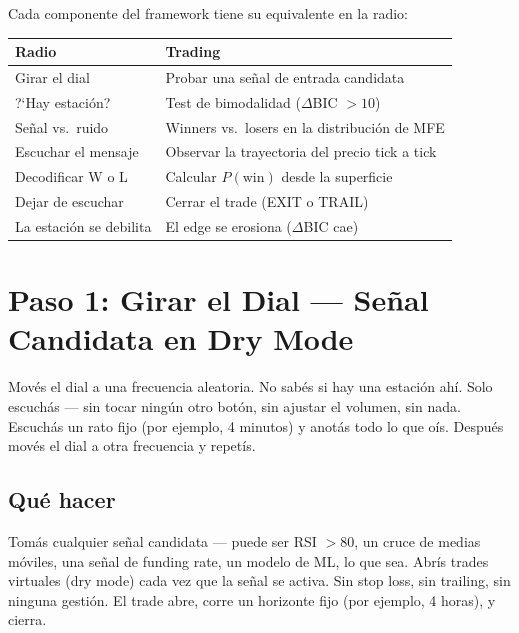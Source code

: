 \documentclass[11pt,a4paper]{article}
\newcommand{\pw}{P(\text{win})}
\begin{document}
Cada componente del framework tiene su equivalente en la radio:

\begin{table}[H]
\centering
\renewcommand{\arraystretch}{1.4}
\begin{tabularx}{\textwidth}{lX}
\toprule
\textbf{Radio} & \textbf{Trading} \\
\midrule
Girar el dial & Probar una se\~nal de entrada candidata \\
?`Hay estaci\'on? & Test de bimodalidad ($\Delta$BIC $> 10$) \\
Se\~nal vs.\ ruido & Winners vs.\ losers en la distribuci\'on de MFE \\
Escuchar el mensaje & Observar la trayectoria del precio tick a tick \\
Decodificar W o L & Calcular $\pw$ desde la superficie \\
Dejar de escuchar & Cerrar el trade (EXIT o TRAIL) \\
La estaci\'on se debilita & El edge se erosiona ($\Delta$BIC cae) \\
\bottomrule
\end{tabularx}
\end{table}


\section{Paso 1: Girar el Dial --- Se\~nal Candidata en Dry Mode}
\label{sec:paso1}

\begin{tcolorbox}[radio, title=La radio: girar el dial]
Mov\'es el dial a una frecuencia aleatoria. No sab\'es si hay una
estaci\'on ah\'i. Solo escuch\'as --- sin tocar ning\'un otro bot\'on,
sin ajustar el volumen, sin nada. Escuch\'as un rato fijo (por ejemplo,
4 minutos) y anot\'as todo lo que o\'is. Despu\'es mov\'es el dial
a otra frecuencia y repet\'is.
\end{tcolorbox}

\subsection{Qu\'e hacer}

Tom\'as cualquier se\~nal candidata --- puede ser RSI $> 80$, un cruce
de medias m\'oviles, una se\~nal de funding rate, un modelo de ML, lo que
sea. Abr\'is trades virtuales (dry mode) cada vez que la se\~nal
se activa. Sin stop loss, sin trailing, sin ninguna gesti\'on. El trade
abre, corre un horizonte fijo (por ejemplo, 4 horas), y cierra.
\end{document}
